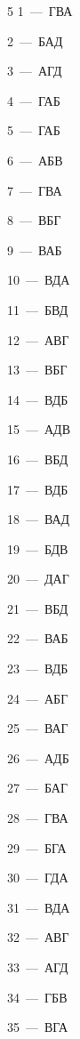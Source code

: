 \documentclass[12pt]{article}
\begin{document}
\clearpage
{}

\par\vspace{0.3cm}

\begin{multicols}{5}\noindent
\mbox{1~--- ГВА}\par
\mbox{2~--- БАД}\par
\mbox{3~--- АГД}\par
\mbox{4~--- ГАБ}\par
\mbox{5~--- ГАБ}\par
\mbox{6~--- АБВ}\par
\mbox{7~--- ГВА}\par
\mbox{8~--- ВБГ}\par
\mbox{9~--- ВАБ}\par
\mbox{10~--- ВДА}\par
\mbox{11~--- БВД}\par
\mbox{12~--- АВГ}\par
\mbox{13~--- ВБГ}\par
\mbox{14~--- ВДБ}\par
\mbox{15~--- АДВ}\par
\mbox{16~--- ВБД}\par
\mbox{17~--- ВДБ}\par
\mbox{18~--- ВАД}\par
\mbox{19~--- БДВ}\par
\mbox{20~--- ДАГ}\par
\mbox{21~--- ВБД}\par
\mbox{22~--- ВАБ}\par
\mbox{23~--- ВДБ}\par
\mbox{24~--- АБГ}\par
\mbox{25~--- ВАГ}\par
\mbox{26~--- АДБ}\par
\mbox{27~--- БАГ}\par
\mbox{28~--- ГВА}\par
\mbox{29~--- БГА}\par
\mbox{30~--- ГДА}\par
\mbox{31~--- ВДА}\par
\mbox{32~--- АВГ}\par
\mbox{33~--- АГД}\par
\mbox{34~--- ГБВ}\par
\mbox{35~--- ВГА}\par

\end{multicols}
\end{document}
